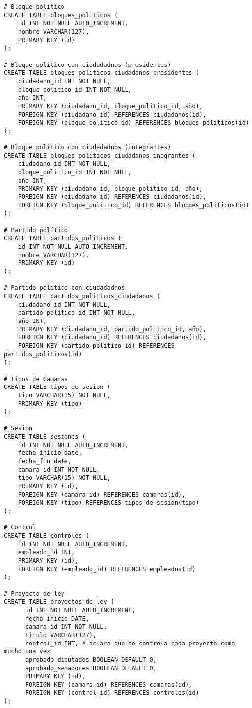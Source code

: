 \begin{verbatim}
# Bloque politico
CREATE TABLE bloques_politicos (
    id INT NOT NULL AUTO_INCREMENT,
    nombre VARCHAR(127),
    PRIMARY KEY (id)
);

# Bloque politico con ciudadadnos (presidentes)
CREATE TABLE bloques_politicos_ciudadanos_presidentes (
    ciudadano_id INT NOT NULL,
    bloque_politico_id INT NOT NULL,
    año INT,
    PRIMARY KEY (ciudadano_id, bloque_politico_id, año),
    FOREIGN KEY (ciudadano_id) REFERENCES ciudadanos(id),
    FOREIGN KEY (bloque_politico_id) REFERENCES bloques_politicos(id) 
);

# Bloque politico con ciudadadnos (integrantes)
CREATE TABLE bloques_politicos_ciudadanos_inegrantes (
    ciudadano_id INT NOT NULL,
    bloque_politico_id INT NOT NULL,
    año INT,
    PRIMARY KEY (ciudadano_id, bloque_politico_id, año),
    FOREIGN KEY (ciudadano_id) REFERENCES ciudadanos(id),
    FOREIGN KEY (bloque_politico_id) REFERENCES bloques_politicos(id) 
);

# Partido político
CREATE TABLE partidos_politicos (
    id INT NOT NULL AUTO_INCREMENT,
    nombre VARCHAR(127),
    PRIMARY KEY (id)
);

# Partido politico con ciudadadnos
CREATE TABLE partidos_politicos_ciudadanos (
    ciudadano_id INT NOT NULL,
    partido_politico_id INT NOT NULL,
    año INT,
    PRIMARY KEY (ciudadano_id, partido_politico_id, año),
    FOREIGN KEY (ciudadano_id) REFERENCES ciudadanos(id),
    FOREIGN KEY (partido_politico_id) REFERENCES partidos_politicos(id) 
);

# Tipos de Camaras
CREATE TABLE tipos_de_sesion (
    tipo VARCHAR(15) NOT NULL,
    PRIMARY KEY (tipo)
);

# Sesion
CREATE TABLE sesiones (
    id INT NOT NULL AUTO_INCREMENT,
    fecha_inicio date,
    fecha_fin date,
    camara_id INT NOT NULL,
    tipo VARCHAR(15) NOT NULL,
    PRIMARY KEY (id),
    FOREIGN KEY (camara_id) REFERENCES camaras(id),
    FOREIGN KEY (tipo) REFERENCES tipos_de_sesion(tipo)
);

# Control
CREATE TABLE controles (
    id INT NOT NULL AUTO_INCREMENT,
    empleado_id INT,
    PRIMARY KEY (id),
    FOREIGN KEY (empleado_id) REFERENCES empleados(id)
);

# Proyecto de ley
CREATE TABLE proyectos_de_ley (
      id INT NOT NULL AUTO_INCREMENT,
      fecha_inicio DATE,
      camara_id INT NOT NULL,
      titulo VARCHAR(127),
      control_id INT, # aclara que se controla cada proyecto como mucho una vez
      aprobado_diputados BOOLEAN DEFAULT 0,
      aprobado_senadores BOOLEAN DEFAULT 0,
      PRIMARY KEY (id),
      FOREIGN KEY (camara_id) REFERENCES camaras(id),
      FOREIGN KEY (control_id) REFERENCES controles(id)
);


\end{verbatim}
